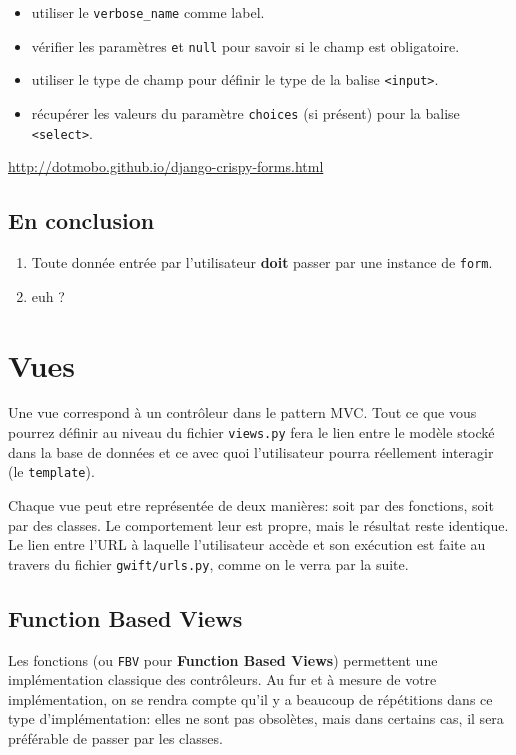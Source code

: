 \documentclass[11pt]{amsbook}
\begin{document}
\begin{itemize}

\item utiliser le \texttt{verbose\_name} comme label.

\item vérifier les paramètres \texttt et \texttt{null} pour savoir si le champ est obligatoire.

\item utiliser le type de champ pour définir le type de la balise \texttt{<input>}.

\item récupérer les valeurs du paramètre \texttt{choices} (si présent) pour la balise \texttt{<select>}.

\end{itemize}


\href{http://dotmobo.github.io/django-crispy-forms.html}{http://dotmobo.github.io/django-crispy-forms.html}


\hypertarget{x-en-conclusion}{\section{En conclusion}}
\begin{enumerate}

\item{Toute donnée entrée par l’utilisateur \textbf{doit} passer par une instance de \texttt{form}.}

\item{euh ?}

\end{enumerate}


\hypertarget{x-vues}{\chapter{Vues}}
Une vue correspond à un contrôleur dans le pattern MVC. Tout ce que vous pourrez définir au niveau du fichier \texttt{views.py} fera le lien entre le modèle stocké dans la base de données et ce avec quoi l’utilisateur pourra réellement interagir (le \texttt{template}).


Chaque vue peut etre représentée de deux manières: soit par des fonctions, soit par des classes. Le comportement leur est propre, mais le résultat reste identique. Le lien entre l’URL à laquelle l’utilisateur accède et son exécution est faite au travers du fichier \texttt{gwift/urls.py}, comme on le verra par la suite.


\hypertarget{x-function-based-views}{\section{Function Based Views}}
Les fonctions (ou \texttt{FBV} pour \textbf{Function Based Views}) permettent une implémentation classique des contrôleurs. Au fur et à mesure de votre implémentation, on se rendra compte qu’il y a beaucoup de répétitions dans ce type d’implémentation: elles ne sont pas obsolètes, mais dans certains cas, il sera préférable de passer par les classes.
\end{document}
